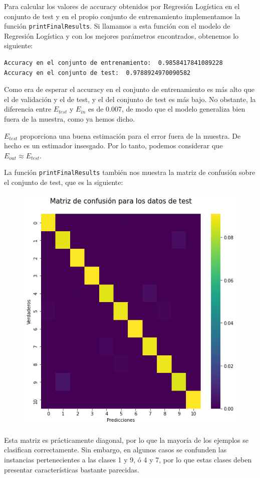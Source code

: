 \documentclass[a4]{article}
\begin{document}
Para calcular los valores de accuracy obtenidos por Regresión Logística en el conjunto de test y en el propio conjunto de entrenamiento implementamos la función \lstinline|printFinalResults|. Si llamamos a esta función con el modelo de Regresión Logística y con los mejores parámetros encontrados, obtenemos lo siguiente:

\begin{lstlisting}
Accuracy en el conjunto de entrenamiento:  0.9858417841089228
Accuracy en el conjunto de test:  0.9788924970090582
\end{lstlisting}

Como era de esperar el accuracy en el conjunto de entrenamiento es más alto que el de validación y el de test, y el del conjunto de test es más bajo. No obstante, la diferencia entre $E_{test}$ y $E_{in}$ es de 0.007, de modo que el modelo generaliza bien fuera de la muestra, como ya hemos dicho. 

$E_{test}$ proporciona una buena estimación para el error fuera de la muestra. De hecho es un estimador insesgado. Por lo tanto, podemos considerar que $E_{out}\approx E_{test}$.

La función \lstinline|printFinalResults| también nos muestra la matriz de confusión sobre el conjunto de test, que es la siguiente: 
\begin{figure}[H]
	\centering
	\includegraphics[width=0.5\linewidth]{img/confussion}
	\caption{}
	\label{fig:confussion}
\end{figure}

Esta matriz es prácticamente diagonal, por lo que la mayoría de los ejemplos se clasifican correctamente. Sin embargo, en algunos casos se confunden las instancias pertenecientes a las clases 1 y 9, ó 4 y 7, por lo que estas clases deben presentar características bastante parecidas. 
\end{document}
